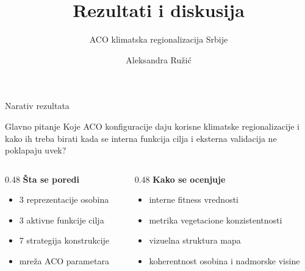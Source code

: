 \documentclass[aspectratio=169,10pt]{beamer}
\title[Rezultati i diskusija]{Rezultati i diskusija}
\subtitle{ACO klimatska regionalizacija Srbije}
\author{Aleksandra Ružić}
\date{}
\begin{document}
\begin{frame}
  \titlepage
\end{frame}

\begin{frame}{Narativ rezultata}
  \begin{block}{Glavno pitanje}
    Koje ACO konfiguracije daju korisne klimatske regionalizacije i kako ih treba birati kada se interna funkcija cilja i eksterna validacija ne poklapaju uvek?
  \end{block}

  \vspace{0.5em}
  \begin{columns}[T]
    \begin{column}{0.48\textwidth}
      \textbf{Šta se poredi}
      \begin{itemize}
        \item 3 reprezentacije osobina
        \item 3 aktivne funkcije cilja
        \item 7 strategija konstrukcije
        \item mreža ACO parametara
      \end{itemize}
    \end{column}
    \begin{column}{0.48\textwidth}
      \textbf{Kako se ocenjuje}
      \begin{itemize}
        \item interne fitness vrednosti
        \item metrika vegetacione konzistentnosti
        \item vizuelna struktura mapa
        \item koherentnost osobina i nadmorske visine
      \end{itemize}
    \end{column}
  \end{columns}
\end{frame}
\end{document}
